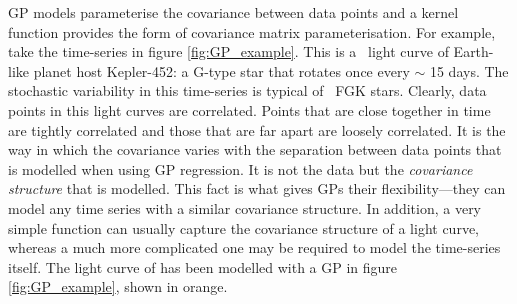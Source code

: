 GP models parameterise the covariance between data points and a kernel
function provides the form of covariance matrix parameterisation.
For example, take the time-series in figure \ref{fig:GP_example}.
This is a \kepler\ light curve of Earth-like planet host Kepler-452: a G-type
star that rotates once every $\sim$ 15 days.
The stochastic variability in this time-series is typical of \kepler\ FGK
stars.
Clearly, data points in this light curves are correlated.
Points that are close together in time are tightly correlated and those that
are far apart are loosely correlated.
It is the way in which the covariance varies with the separation between data
points that is modelled when using GP regression.
It is not the data but the {\it covariance structure} that is modelled.
This fact is what gives GPs their flexibility---they can model any time
series with a similar covariance structure.
In addition, a very simple function can usually capture the covariance
structure of a light curve, whereas a much more complicated one may be
required to model the time-series itself.
The light curve of  has been modelled with a GP in figure
\ref{fig:GP_example}, shown in orange.

